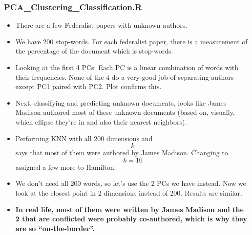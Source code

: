 \documentclass[]{article}
\providecommand{\tightlist}{%
  \setlength{\itemsep}{0pt}\setlength{\parskip}{0pt}}
\begin{document}
\hypertarget{pca_clustering_classification.r}{%
\subsubsection{PCA\_Clustering\_Classification.R}\label{pca_clustering_classification.r}}

\begin{itemize}
\tightlist
\item
  There are a few Federalist papers with unknown authors.
\item
  We have 200 stop-words. For each federalist paper, there is a
  measurement of the percentage of the document which is stop-words.
\item
  Looking at the first 4 PCs: Each PC is a linear combination of words
  with their frequencies. None of the 4 do a very good job of separating
  authors except PC1 paired with PC2. Plot confirms this.
\item
  Next, classifying and predicting unknown documents, looks like James
  Madison authored most of these unknown documents (based on, visually,
  which ellipse they're in and also their nearest neighbors).
\item
  Performing KNN with all 200 dimensions and \[k\] says that most of
  them were authored by James Madison. Changing to \[k = 10\] assigned a
  few more to Hamilton.
\item
  We don't need all 200 words, so let's use the 2 PCs we have instead.
  Now we look at the closest point in 2 dimensions instead of 200.
  Results are similar.
\item
  \textbf{In real life, most of them were written by James Madison and
  the 2 that are conflicted were probably co-authored, which is why they
  are so ``on-the-border''.}
\end{itemize}
\end{document}
